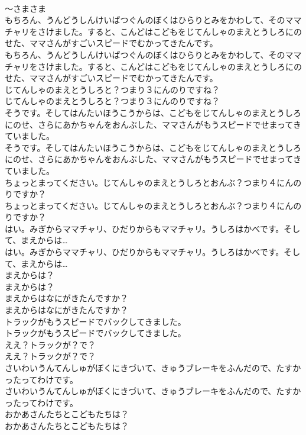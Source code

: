 \documentclass[8pt]{extreport}
\begin{document}
\begin{CJK}{UTF8}{min}
\\	～さまさま
\\	もちろん、うんどうしんけいばつぐんのぼくはひらりとみをかわして、そのママチャリをさけました。すると、こんどはこどもをじてんしゃのまえとうしろにのせた、ママさんがすごいスピードでむかってきたんです。	
\\	もちろん、うんどうしんけいばつぐんのぼくはひらりとみをかわして、そのママチャリをさけました。すると、こんどはこどもをじてんしゃのまえとうしろにのせた、ママさんがすごいスピードでむかってきたんです。 
\\	じてんしゃのまえとうしろと？つまり３にんのりですね？	
\\	じてんしゃのまえとうしろと？つまり３にんのりですね？ 
\\	そうです。そしてはんたいほうこうからは、こどもをじてんしゃのまえとうしろにのせ、さらにあかちゃんをおんぶした、ママさんがもうスピードでせまってきていました。	
\\	そうです。そしてはんたいほうこうからは、こどもをじてんしゃのまえとうしろにのせ、さらにあかちゃんをおんぶした、ママさんがもうスピードでせまってきていました。 
\\	ちょっとまってください。じてんしゃのまえとうしろとおんぶ？つまり４にんのりですか？	
\\	ちょっとまってください。じてんしゃのまえとうしろとおんぶ？つまり４にんのりですか？ 
\\	はい。みぎからママチャリ、ひだりからもママチャリ。うしろはかべです。そして、まえからは…	
\\	はい。みぎからママチャリ、ひだりからもママチャリ。うしろはかべです。そして、まえからは… 
\\	まえからは？	
\\	まえからは？ 
\\	まえからはなにがきたんですか？	
\\	まえからはなにがきたんですか？ 
\\	トラックがもうスピードでバックしてきました。	
\\	トラックがもうスピードでバックしてきました。 
\\	ええ？トラックが？で？	
\\	ええ？トラックが？で？ 
\\	さいわいうんてんしゅがぼくにきづいて、きゅうブレーキをふんだので、たすかったってわけです。	
\\	さいわいうんてんしゅがぼくにきづいて、きゅうブレーキをふんだので、たすかったってわけです。 
\\	おかあさんたちとこどもたちは？	
\\	おかあさんたちとこどもたちは？ 

\end{CJK}
\end{document}
